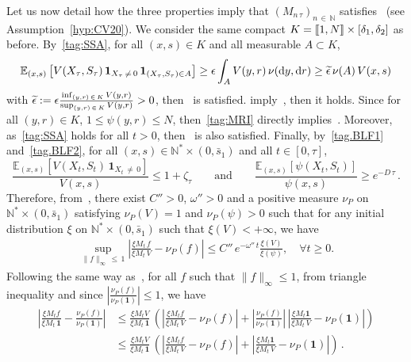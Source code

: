 \documentclass[AHL,Unicode,longabstracts,published]{cedram}
\newcommand{\llbracket}{\mathopen{[\mkern -2.7mu[}}
\newcommand{\rrbracket}{\mathclose{]\mkern -2.7mu]}}
\newcommand{\NN}{\mathbb{N}}
\newcommand{\EE}{\mathbb{E}}
\newcommand{\X}{\NN^* \times (0,\bar s_1)}
\newcommand{\dif}{\mathrm{d}}
\newcommand{\1}{\mathbf{1}}
\let\oldtilde\tilde
\renewcommand*{\tilde}[1]{\mathchoice{\widetilde{#1}}{\widetilde{#1}}{\oldtilde{#1}}{\oldtilde{#1}}}
\let\oldforall\forall
\renewcommand*{\forall}{\mathrel{\oldforall}}
\begin{document}
Let us now detail how the three properties imply that $(M_{n\,\tau})_{n\,\in\,\NN}$ satisfies~\cite[Assumption~G]{CV20} (see Assumption~\ref{hyp:CV20}). We consider the same compact $K=\llbracket 1,N\rrbracket\times [\delta_1,\delta_2]$ as before. By~\eqref{tag:SSA}, for all $(x,s)\in K$ and all measurable $A\subset K$,
\[
\EE_{(x,s)}\left[V(X_\tau,S_\tau)\,\1_{X_\tau\,\neq\,0}\,\1_{\left(X_\tau,S_\tau\right)\in A}\right]
\geq \epsilon \int_A V(y,r)\,\nu(\dif y, \dif r)
\geq \tilde \epsilon\, \nu(A)\,V(x,s)
\]
with $\tilde \epsilon:=\epsilon \frac{\inf_{(y,r)\,\in\,K}V(y,r)}{\sup_{(y,r)\,\in\,K}V(y,r)}>0$, then~\cite[Assumption~(G1)]{CV20} is satisfied. \cite[Assumptions~(A1) and~(A2)]{BCGM} imply~\cite[Assumption~(G2)]{CV20}, then it holds. Since for all $(y,r)\in K$, $1\leq \psi(y,r)\leq N$, then~\eqref{tag:MRI} directly implies~\cite[Assumption~(G3)]{CV20}. Moreover, as~\eqref{tag:SSA} holds for all $t>0$, then~\cite[Assumption~(G4)]{CV20} is also satisfied. Finally, by~\eqref{tag.BLF1} and~\eqref{tag.BLF2}, for all $(x,s)\in \X$ and all $t\in[0,\tau]$,
\[
\frac{\EE_{(x,s)}\left[V(X_t,S_t) \,\1_{X_t\,\neq\,0}\right]}{V(x,s)} \leq 1 + \zeta_\tau
\qquad
\text{and}
\qquad
\frac{\EE_{(x,s)}\left[\psi(X_t, S_t) \right]}{\psi(x,s)} \geq e^{-D\,\tau} \,.
\]
Therefore, from~\cite[Corollary~2.4.]{CV20}, there exist $C''>0$, $\omega''>0$ and a positive measure $\nu_P$ on $\X$ satisfying $\nu_P(V)=1$ and $\nu_P(\psi)>0$ such that for any initial distribution $\xi$ on $\X$ such that $\xi(V)<+\infty$, we have
\begin{align}\label{eq:borne_CV}
\sup_{\|f \|_\infty\,\leq\,1} \left| \frac{\xi M_t\,f}{\xi M_t\,V} -\nu_P(f)\right| \leq C''\,e^{-\omega''\,t} \frac{\xi(V)}{\xi(\psi)}, \quad \forall t\geq 0.
\end{align}
Following the same way as~\cite[Proof of Corollary~3.7]{BCGM}, for all $f$ such that $\|f \|_\infty \leq 1$, from triangle inequality and since $\left|\frac{\nu_P(f)}{\nu_P(\1)}\right|\leq 1$, we have
\begin{align*}
\left|\frac{\xi M_t f}{\xi M_t\,\1} - \frac{\nu_P(f)}{\nu_P(\1)}\right| &\leq
\frac{\xi M_t V}{\xi M_t\,\1}\, \left(
\left|\frac{\xi M_t f}{\xi M_t\,V} - \nu_P(f)\right| +
\left|\frac{\nu_P(f)}{\nu_P(\1)}\right|\,\left| \frac{\xi M_t \1}{\xi M_t\,V} - \nu_P(\1)\right| \right)\\
&\leq
\frac{\xi M_t V}{\xi M_t\,\1}\, \left(
\left| \frac{\xi M_t f}{\xi M_t\,V} - \nu_P(f)\right| +
\left| \frac{\xi M_t \1}{\xi M_t\,V} - \nu_P(\1)\right| \right)\,.
\end{align*}
\end{document}

